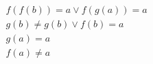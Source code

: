 \begin{align*}
%
& f(f(b)) = a \lor f(g(a)) = a
~\\~
& g(b)  \neq  g(b) \lor f(b) = a
~\\~
& g(a) = a
~\\~
& f(a)  \neq  a
%
\end{align*}

